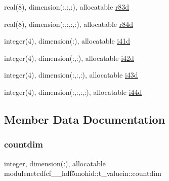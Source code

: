\begin{DoxyCompactItemize}
\item 
real(8), dimension(\+:,\+:,\+:), allocatable \mbox{\hyperlink{structmodulenetcdfcf__2__hdf5mohid_1_1t__valuein_a5998869bffbd04f1ddb7baf654346a97}{r83d}}
\item 
real(8), dimension(\+:,\+:,\+:,\+:), allocatable \mbox{\hyperlink{structmodulenetcdfcf__2__hdf5mohid_1_1t__valuein_a57db5d8364de9f936fd4a12614a3b20e}{r84d}}
\item 
integer(4), dimension(\+:), allocatable \mbox{\hyperlink{structmodulenetcdfcf__2__hdf5mohid_1_1t__valuein_a938c1a06bdab0d0a37206fe8f2584f22}{i41d}}
\item 
integer(4), dimension(\+:,\+:), allocatable \mbox{\hyperlink{structmodulenetcdfcf__2__hdf5mohid_1_1t__valuein_ab76a7eb2083cf475bec6e17a81f758c0}{i42d}}
\item 
integer(4), dimension(\+:,\+:,\+:), allocatable \mbox{\hyperlink{structmodulenetcdfcf__2__hdf5mohid_1_1t__valuein_a741f4ee687f16c57dcf3cad60c2fd4f4}{i43d}}
\item 
integer(4), dimension(\+:,\+:,\+:,\+:), allocatable \mbox{\hyperlink{structmodulenetcdfcf__2__hdf5mohid_1_1t__valuein_a8dd893938d37d5cb731b5ad791e196e9}{i44d}}
\end{DoxyCompactItemize}


\subsection{Member Data Documentation}
\mbox{\label{structmodulenetcdfcf__2__hdf5mohid_1_1t__valuein_ae8ade5af0d8e96842436207f1f3d4074}} 
\subsubsection{\texorpdfstring{countdim}{countdim}}
{\footnotesize\ttfamily integer, dimension(\+:), allocatable modulenetcdfcf\+\_\+\_\+hdf5mohid\+::t\+\_\+valuein\+::countdim\hspace{0.3cm}{\ttfamily [private]}}

\mbox{\label{structmodulenetcdfcf__2__hdf5mohid_1_1t__valuein_ac7b16c4833a303f4b3f0c5c04a5a32db}} 
